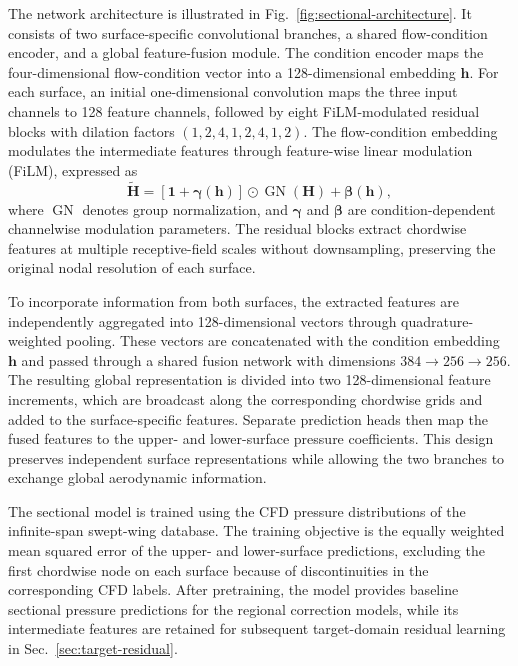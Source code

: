 The network architecture is illustrated in Fig.~\ref{fig:sectional-architecture}. It consists of two surface-specific convolutional branches, a shared flow-condition encoder, and a global feature-fusion module. The condition encoder maps the four-dimensional flow-condition vector into a 128-dimensional embedding $\mathbf h$. For each surface, an initial one-dimensional convolution maps the three input channels to 128 feature channels, followed by eight FiLM-modulated residual blocks with dilation factors $(1,2,4,1,2,4,1,2)$. The flow-condition embedding modulates the intermediate features through feature-wise linear modulation (FiLM), expressed as
\begin{equation}
    \widetilde{\mathbf H}
    =\left[\mathbf 1+\boldsymbol\gamma(\mathbf h)\right]
    \odot \operatorname{GN}(\mathbf H)+\boldsymbol\beta(\mathbf h),
    \label{eq:sectional-film}
\end{equation}
where $\operatorname{GN}$ denotes group normalization, and $\boldsymbol\gamma$ and $\boldsymbol\beta$ are condition-dependent channelwise modulation parameters. The residual blocks extract chordwise features at multiple receptive-field scales without downsampling, preserving the original nodal resolution of each surface.

To incorporate information from both surfaces, the extracted features are independently aggregated into 128-dimensional vectors through quadrature-weighted pooling. These vectors are concatenated with the condition embedding $\mathbf h$ and passed through a shared fusion network with dimensions $384\rightarrow256\rightarrow256$. The resulting global representation is divided into two 128-dimensional feature increments, which are broadcast along the corresponding chordwise grids and added to the surface-specific features. Separate prediction heads then map the fused features to the upper- and lower-surface pressure coefficients. This design preserves independent surface representations while allowing the two branches to exchange global aerodynamic information.

The sectional model is trained using the CFD pressure distributions of the infinite-span swept-wing database. The training objective is the equally weighted mean squared error of the upper- and lower-surface predictions, excluding the first chordwise node on each surface because of discontinuities in the corresponding CFD labels. After pretraining, the model provides baseline sectional pressure predictions for the regional correction models, while its intermediate features are retained for subsequent target-domain residual learning in Sec.~\ref{sec:target-residual}.

